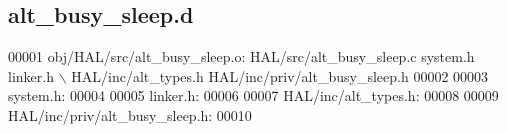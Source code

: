 \subsection{alt\+\_\+busy\+\_\+sleep.\+d}
\label{alt__busy__sleep_8d_source}

\begin{DoxyCode}
00001 obj/HAL/src/alt_busy_sleep.o: HAL/src/alt_busy_sleep.c system.h linker.h \(\backslash\)
 HAL/inc/alt\_types.h HAL/inc/priv/alt_busy_sleep.h
00002 
00003 system.h:
00004 
00005 linker.h:
00006 
00007 HAL/inc/alt\_types.h:
00008 
00009 HAL/inc/priv/alt_busy_sleep.h:
00010 \end{DoxyCode}

